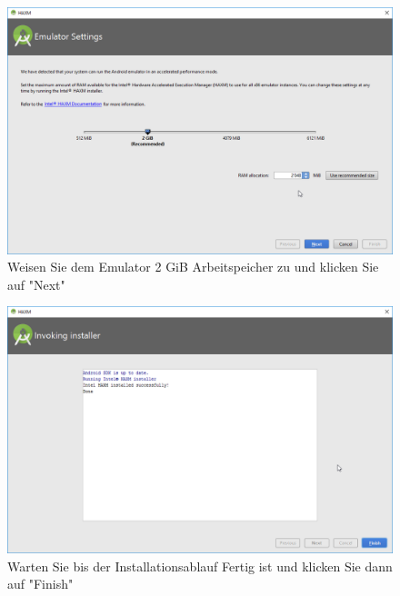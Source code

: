 \documentclass[a4paper,10pt,xetex]{article}
\begin{document}
\begin{figure}
  \centering
  \includegraphics[width=\textwidth]{Installation/3-4}
  \caption{Weisen Sie dem Emulator 2 GiB Arbeitspeicher zu und klicken Sie auf "Next"}
\end{figure}

\begin{figure}
  \centering
  \includegraphics[width=\textwidth]{Installation/3-5}
  \caption{Warten Sie bis der Installationsablauf Fertig ist und klicken Sie dann auf "Finish"}
\end{figure}
\end{document}
